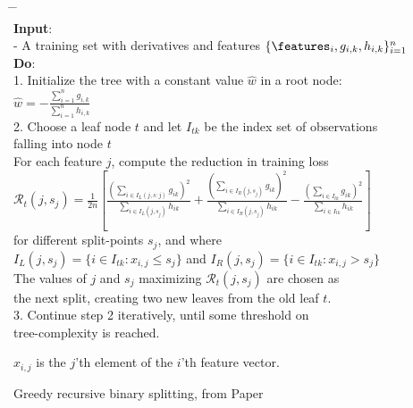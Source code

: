 \begin{algorithm*}[h!]
	\begin{tabbing}
		\hspace{2em} \= \hspace{2em} \= \hspace{2em} \= \\
		{\bfseries Input}: \\
		\> - A training set with derivatives and features $\{\features_i, g_{i,k}, h_{i,k}\}_{i=1}^n$\\
		
		{\bfseries Do}: \\
		1. Initialize the tree with a constant value $\hat{w}$ in a root node:\\
		\>	$\hat{w} = - \frac{\sum_{i=1}^{n}g_{i,k}}{\sum_{i=1}^{n}h_{i,k}}$\\
		
		2. Choose a leaf node $t$ and let $I_{tk}$ be the index set of observations\\
		\> falling into node $t$\\ 
		\> For each feature $j$, compute the reduction in training loss\\
		\> $ \mathcal{R}_t(j,s_j)=\frac{1}{2n}\left[ \frac{\left(\sum_{i\in I_{L}(j,s:j)}g_{ik}\right)^2}{\sum_{i\in I_{L}(j,s_j)}h_{ik}}
		+ \frac{\left(\sum_{i\in I_{R}(j,s_j)}g_{ik}\right)^2}{\sum_{i\in I_{R}(j,s_j)}h_{ik}}	
		-\frac{\left(\sum_{i\in I_{tk}}g_{ik}\right)^2}{\sum_{i\in I_{tk}}h_{ik}} \right] $\\
		\> 		for different split-points $s_j$, and where\\ 
		\> $I_{L}(j,s_j) = \{ i\in I_{tk}: x_{i,j}\leq s_j \}$ and
		 $I_{R}(j, s_j) = \{ i\in I_{tk} : x_{i,j} > s_j \}$\\
		\> The values of $j$ and $s_j$ maximizing $\mathcal R_t(j,s_j)$ are chosen as\\
		\> the next split, creating two new leaves from the old leaf $t$.\\
		
		3. Continue step 2 iteratively, until some threshold on\\
		\> tree-complexity is reached.
		
	\end{tabbing}
	
	\vspace{0.5cm}
	$x_{i,j}$ is the $j$'th element of the $i$'th feature vector.
	\vspace{0.5cm}
	
	\caption{\label{alg:recursive-binary-splitting} Greedy recursive binary splitting, from Paper  }
\end{algorithm*}

